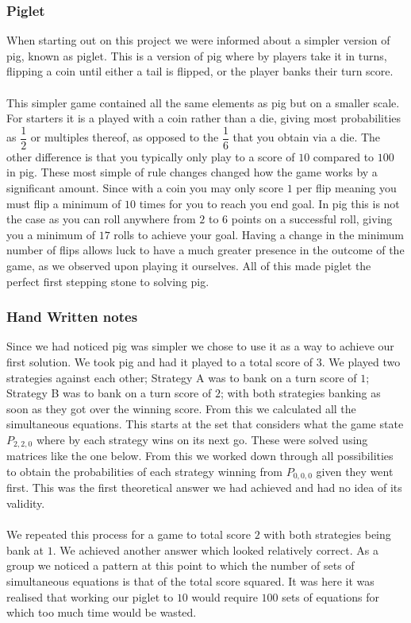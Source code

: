 \documentclass[a4paper,titlepage]{article}
\begin{document}
\subsubsection{Piglet}
When starting out on this project we were informed about a simpler version of pig, known as piglet. This is a version of pig where by players take it in turns, flipping a coin until either a tail is flipped, or the player banks their turn score.\\ \\
This simpler game contained all the same elements as pig but on a smaller scale. For starters it is a played with a coin rather than a die, giving most probabilities as $\dfrac{1}{2}$ or multiples thereof, as opposed to the $\dfrac{1}{6}$ that you obtain via a die. The other difference is that you typically only play to a score of $10$ compared to $100$ in pig. These most simple of rule changes changed how the game works by a significant amount. Since with a coin you may only score $1$ per flip meaning you must flip a minimum of $10$ times for you to reach you end goal. In pig this is not the case as you can roll anywhere from $2$ to $6$ points on a successful roll, giving you a minimum of $17$ rolls to achieve your goal. Having a change in the minimum number of flips allows luck to have a much greater presence in the outcome of the game, as we observed upon playing it ourselves. All of this made piglet the perfect first stepping stone to solving pig. 

\subsubsection{Hand Written notes}
Since we had noticed pig was simpler we chose to use it as a way to achieve our first solution. We took pig and had it played to a total score of $3$. We played two strategies against each other; Strategy A was to bank on a turn score of $1$; Strategy B was to bank on a turn score of $2$; with both strategies banking as soon as they got over the winning score. From this we calculated all the simultaneous equations. This starts at the set that considers what the game state $P_{2,2,0}$ where by each strategy wins on its next go. These were solved using matrices like the one below. 
From this we worked down through all possibilities to obtain the probabilities of each strategy winning from $P_{0,0,0}$ given they went first. This was the first theoretical answer we had achieved and had no idea of its validity.\\ \\
We repeated this process for a game to total score $2$ with both strategies being bank at $1$. We achieved another answer which looked relatively correct. As a group we noticed a pattern at this point to which the number of sets of simultaneous equations is that of the total score squared. It was here it was realised that working our piglet to $10$ would require $100$ sets of equations for which too much time would be wasted.
\end{document}

